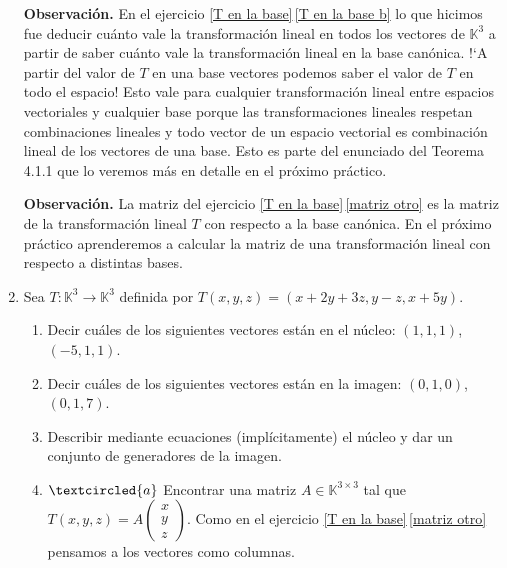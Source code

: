 \documentclass[a4paper,12pt,twoside,spanish,reqno]{amsbook}
\numberwithin{equation}{section}
\begin{document}
\begin{enumerate}[topsep=6pt, itemsep=.4cm]
\textbf{Observación.} 
En el ejercicio \ref{T en la base}\,\ref{T en la base b} lo que hicimos fue deducir cuánto vale la transformación lineal en todos los vectores de $\mathbb{K}^3$ a partir de saber cuánto vale la transformación lineal en la base canónica. !`A partir del valor de $T$ en una base vectores podemos saber el valor de $T$ en todo el espacio! Esto vale para cualquier transformación lineal entre espacios vectoriales y cualquier base porque las transformaciones lineales respetan combinaciones lineales y todo vector de un espacio vectorial es combinación lineal de los vectores de una base. Esto es parte del enunciado del Teorema 4.1.1 que lo veremos más en detalle en el próximo práctico.

\textbf{Observación.} La matriz del ejercicio  \ref{T en la base}\,\ref{matriz otro} es la matriz de la transformación lineal $T$ con respecto a la base canónica. En el próximo práctico aprenderemos a calcular la matriz de una transformación lineal 
    con respecto a distintas bases.

    
\item\label{Txyz} Sea $T:\mathbb{K}^3\longrightarrow\mathbb{K}^3$ definida por $T(x,y,z)=(x+2y+3z, y-z,x+5y)$.
\begin{enumerate}
\item Decir cuáles de los siguientes vectores están en el núcleo: $(1,1,1)$, $(-5,1,1)$.
\item Decir cuáles de los siguientes vectores están en la imagen: $(0,1,0)$, $(0,1,7)$.
 \item\label{Txyz nucleo} Describir mediante ecuaciones (implícitamente) el núcleo y dar un conjunto de generadores de la imagen.
 \item\label{matriz} $\textcircled{a}$ Encontrar una matriz  $A\in\mathbb{K}^{3\times 3}$ tal que $T(x,y,z)=A\left(\begin{matrix}
    x\\y\\z \end{matrix}
    \right)$.  Como en el ejercicio  \ref{T en la base}\,\ref{matriz otro} pensamos a los vectores como columnas.
\end{enumerate}



\end{enumerate}
\end{document}
